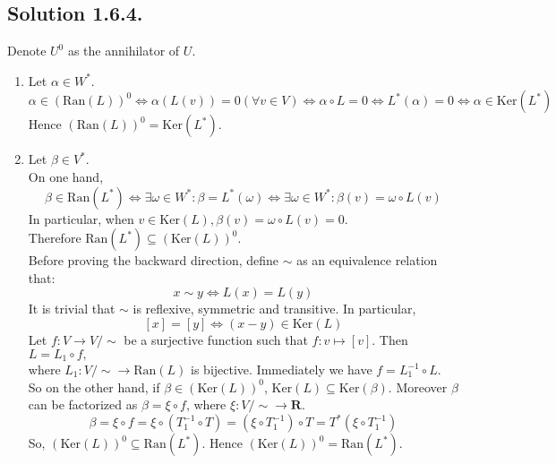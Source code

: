 \documentclass{article}
\begin{document}
\subsection*{Solution 1.6.4.}
Denote $U ^ 0$ as the annihilator of $U$.
\begin{enumerate}
    \item Let $\alpha \in W ^ *$.
    \[\alpha\in (\mathrm{Ran}(L)) ^ 0 \Leftrightarrow \alpha(L(v)) = 0(\forall v\in V)\Leftrightarrow \alpha \circ L = 0 \Leftrightarrow L ^ * (\alpha) = 0\Leftrightarrow \alpha \in \mathrm{Ker}(L ^ *)\]
    Hence $(\mathrm{Ran}(L)) ^ 0 = \mathrm{Ker}(L ^ *)$.
    \item Let $\beta \in V ^ *$. \\
    On one hand,
    \[\beta \in \mathrm{Ran}(L ^ *)\Leftrightarrow \exists \omega \in W ^ *:\beta = L ^ * (\omega)\Leftrightarrow \exists \omega \in W ^ *: \beta(v) = \omega \circ L(v)\]
    In particular, when $v\in \mathrm{Ker}(L),\beta(v) = \omega \circ L(v) = 0$.\\
    Therefore $\mathrm{Ran}(L ^ *) \subseteq (\mathrm{Ker}(L)) ^ 0$. \\
    Before proving the backward direction, define $\sim$ as an equivalence relation that:
    \[x\sim y \Leftrightarrow L(x) = L(y)\]
    It is trivial that $\sim$ is reflexive, symmetric and transitive. In particular,
    \[[x] = [y]\Leftrightarrow (x - y) \in \mathrm{Ker}(L) \]
    Let $f:V\to V/\sim$ be a surjective function such that $f:v\mapsto [v]$. Then $L = L_1 \circ f,$\\
    where $L_1: V/\sim \to \mathrm{Ran}(L)$ is bijective. Immediately we have $f = L_1 ^ {-1} \circ L$. \\
    So on the other hand, if $\beta \in (\mathrm{Ker}(L)) ^ 0$, $\mathrm{Ker}(L)\subseteq \mathrm{Ker}(\beta)$. Moreover $\beta$ can be factorized as $\beta = \xi \circ f$, where $\xi: V/\sim \to \mathbf{R}$.
    \[\beta = \xi \circ f = \xi \circ (T_1 ^ {-1} \circ T) =(\xi\circ T_1 ^ {-1})\circ T = T ^ * (\xi \circ T_1 ^ {-1})\]
    So, $(\mathrm{Ker}(L)) ^ 0 \subseteq \mathrm{Ran}(L ^ *)$.
    Hence $(\mathrm{Ker}(L)) ^ 0 = \mathrm{Ran}(L ^ *)$.
\end{enumerate}
\end{document}

